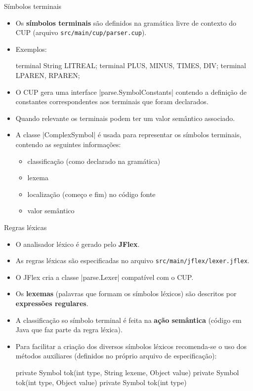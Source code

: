 \documentclass[smaller]{beamer}
\begin{document}
\begin{frame}{Símbolos terminais}
  \begin{itemize}
    \item Os \textbf{símbolos terminais} são definidos na gramática
    livre de contexto do CUP (arquivo
    \texttt{src/main/cup/parser.cup}).
    \item Exemplos:
\begin{pygmented}[]
terminal String LITREAL;
terminal        PLUS, MINUS, TIMES, DIV;
terminal        LPAREN, RPAREN;
\end{pygmented}
    
    \item O CUP gera uma interface \pyginline|parse.SymbolConstants|
    contendo a definição de constantes correspondentes aos terminais
    que foram declarados.
    
    \item Quando relevante os terminais podem ter um valor semântico
    associado.

    \item A classe \pyginline|ComplexSymbol| é usada para representar
    os símbolos terminais, contendo as seguintes informações:
    \begin{itemize}
      \item classificação (como declarado na gramática)
      \item lexema
      \item localização (começo e fim) no código fonte
      \item valor semântico
    \end{itemize}
  \end{itemize}
\end{frame}

\begin{frame}{Regras léxicas}
  \begin{itemize}
    \item O analisador léxico é gerado pelo \textbf{JFlex}.
    \item As regras léxicas são especificadas no arquivo
    \alert{\texttt{src/main/jflex/lexer.jflex}}.
    \item O JFlex cria a classe \pyginline|parse.Lexer| compatível com
    o CUP.
    \item Os \textbf{lexemas} (palavras que formam os símbolos
    léxicos) são descritos por \textbf{expressões regulares}.
    \item A classificação so símbolo terminal é feita na \textbf{ação
      semântica} (código em Java que faz parte da regra léxica).
    \item Para facilitar a criação dos diversos símbolos léxicos
    recomenda-se o uso dos \alert{métodos auxiliares} (definidos no
    próprio arquivo de especificação):
\begin{pygmented}[]
private Symbol tok(int type, String lexeme, Object value)
private Symbol tok(int type, Object value)
private Symbol tok(int type)
\end{pygmented}
  \end{itemize}
\end{frame}
\end{document}
